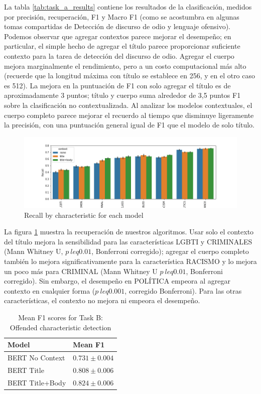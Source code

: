La tabla \ref{tab:task_a_results} contiene los resultados de la clasificación, medidos por precisión, recuperación, F1 y Macro F1 (como se acostumbra en algunas tomas compartidas de Detección de discurso de odio y lenguaje ofensivo). Podemos observar que agregar contextos parece mejorar el desempeño; en particular, el simple hecho de agregar el título parece proporcionar suficiente contexto para la tarea de detección del discurso de odio. Agregar el cuerpo mejora marginalmente el rendimiento, pero a un costo computacional más alto (recuerde que la longitud máxima con título se establece en 256, y en el otro caso es 512). La mejora en la puntuación de F1 con solo agregar el título es de aproximadamente 3 puntos; título y cuerpo suma alrededor de 3,5 puntos F1 sobre la clasificación no contextualizada. Al analizar los modelos contextuales, el cuerpo completo parece mejorar el recuerdo al tiempo que disminuye ligeramente la precisión, con una puntuación general igual de F1 que el modelo de solo título.

\begin{figure}[t]
    \centering
    \includegraphics[width=\textwidth]{img/recall_category.png}
    \caption{Recall by characteristic for each model}
    \label{fig:recall_by_characteristic}
\end{figure}

La figura \ref{fig:recall_by_characteristic} muestra la recuperación de nuestros algoritmos. Usar solo el contexto del título mejora la sensibilidad para las características LGBTI y CRIMINALES (Mann Whitney U, $ p \ leq 0.01 $, Bonferroni corregido); agregar el cuerpo completo también lo mejora significativamente para la característica RACISMO y lo mejora un poco más para CRIMINAL (Mann Whitney U $ p \ leq 0.01 $, Bonferroni corregido). Sin embargo, el desempeño en POLÍTICA empeora al agregar contexto en cualquier forma ($ p \ leq 0.001 $, corregido Bonferroni). Para las otras características, el contexto no mejora ni empeora el desempeño.


\begin{table}
    \centering
    \begin{tabular}{ll}
        \toprule
        Model &            Mean F1 \\
        \midrule
        BERT No Context &  $0.731 \pm 0.004$ \\
        BERT Title      &  $0.808 \pm 0.006$ \\
        BERT Title+Body &  $0.824 \pm 0.006$ \\
        \bottomrule
    \end{tabular}
    \caption{Mean F1 scores for Task B: Offended characteristic detection}
    \label{tab:task_b_results}
\end{table}

